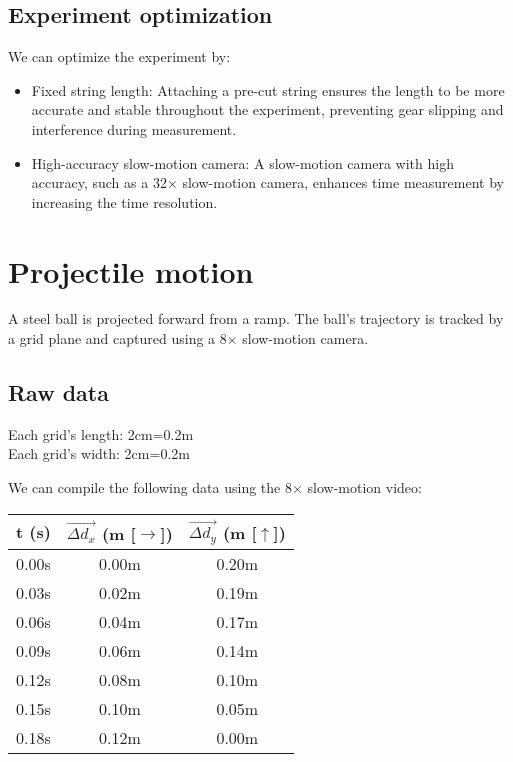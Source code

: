 \documentclass[a4paper,12pt]{article}
\begin{document}
	\subsection{Experiment optimization}
	We can optimize the experiment by:
	\begin{itemize}
		\item Fixed string length: Attaching a pre-cut string ensures the length to be more accurate and stable throughout the experiment, preventing gear slipping and interference during measurement. 
		\item High-accuracy slow-motion camera: A slow-motion camera with high accuracy, such as a 32× slow-motion camera, enhances time measurement by increasing the time resolution.
	\end{itemize}
	\newpage
	
	\section{Projectile motion}
	A steel ball is projected forward from a ramp. The ball's trajectory is tracked by a grid plane and captured using a 8$\times$ slow-motion camera.
	
	\subsection{Raw data}
	Each grid's length: 2cm=0.2m\\
	Each grid's width: 2cm=0.2m
	
	We can compile the following data using the 8$\times$ slow-motion video:
	\bigskip
	\bigskip
	\begin{center}
		\begin{tabular}{ |c|c|c| } 
			\hline
			t (s) & $\vec{\Delta d_x}$ (m [$\rightarrow$]) & $\vec{\Delta d_y}$ (m [$\uparrow$]) \\ 
			\hline\hline
			0.00s & 0.00m & 0.20m\\
			\hline 
			0.03s & 0.02m & 0.19m \\ 
			\hline
			0.06s & 0.04m & 0.17m \\
			\hline
			0.09s & 0.06m & 0.14m \\
			\hline
			0.12s & 0.08m & 0.10m \\
			\hline
			0.15s & 0.10m & 0.05m \\
			\hline
			0.18s & 0.12m & 0.00m \\
			\hline
		\end{tabular} 
	\end{center}
	\bigskip
	\bigskip
	\bigskip
	
\end{document}
